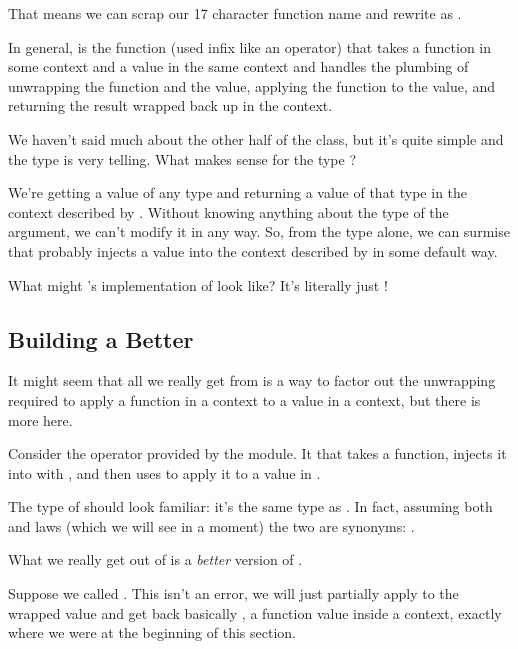 That means we can scrap our 17 character function name and rewrite  as 
.

In general, \code{(<*>)} is the function (used infix like an operator) that takes a function in some  context
 and a value in the same context and handles the plumbing of unwrapping the function and the value, applying the function
to the value, and returning the result wrapped back up in the  context.

We haven't said much about the other half of the  class, but it's quite simple and the type is very telling.
What makes sense for the type ?

We're getting a value of any type and returning a value of that type in the context described by . Without knowing
anything about the type  of the argument, we can't modify it in any way. So, from the type alone, we can surmise that
 probably injects a value into the context described by  in some default way.

What might 's implementation of  look like? It's literally just !

\subsection{Building a Better }

It might seem that all we really get from  is a way to factor out the unwrapping required to apply a function
in a context to a value in a context, but there is more here.

Consider the operator  provided by the  module.
It that takes a function, injects it into  with , and then uses \code{(<*>)} to apply it to a value
in . 

The type of \code{(<\$>)} should look familiar: it's the same type as . In fact, assuming both 
and  laws (which we will see in a moment) the two are synonyms: .

What we really get out of  is a \textit{better} version of .

Suppose we called . This isn't an error, we will just partially apply \code{(+)} to the wrapped
value  and get back basically , a function value inside a  context, exactly where 
we were at the beginning of this section.

